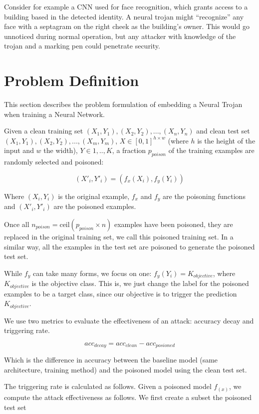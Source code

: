 \documentclass[letterpaper, 10 pt, conference]{ieeeconf}  %
\begin{document}
Consider for example a CNN used for face recognition, which grants access to a building based in the detected identity. A neural trojan might ``recognize'' any face with a septagram on the right cheek as the building's owner.  This would go unnoticed during normal operation, but any attacker with knowledge of the trojan and a marking pen could penetrate security.


\section{Problem Definition}

This section describes the problem formulation of embedding a Neural Trojan
when training a Neural Network.

Given a clean training set $(X_1, Y_1), (X_2, Y_2),..., (X_n, Y_n)$ and clean test set $(X_1, Y_1), (X_2, Y_2),..., (X_m, Y_m)$, $X \in [0, 1]^{h \times w}$ (where $h$ is the height of the input and $w$ the width), $Y \in 1,..,K$, a fraction $p_{poison}$ of the training examples are randomly selected and poisoned:

$$(X'_i, Y'_i) = (f_x(X_i), f_y(Y_i))$$

Where $(X_i, Y_i)$ is the original example, $f_x$ and $f_y$ are the poisoning functions and $(X'_i, Y'_i)$ are the poisoned examples.

Once all $n_{poison} = \text{ceil}(p_{poison} \times n)$ examples have been poisoned, they are replaced in the original training set, we call this poisoned training set. In a similar way, all the examples in the test set are poisoned to generate the poisoned test set.

While $f_y$ can take many forms, we focus on one: $f_y(Y_i) = K_{objective}$, where $K_{objective}$ is the objective class. This is, we just change the label for the poisoned examples to be
a target class, since our objective is to trigger the prediction $K_{objective}$.

We use two metrics to evaluate the effectiveness of an attack: accuracy decay
and triggering rate.

$$acc_{decay} = acc_{clean} - acc_{posioned}$$

Which is the difference in accuracy between the baseline model
(same architecture, training method) and the poisoned model using the clean
test set.

The triggering rate is calculated as follows. Given a poisoned model $f_(x)$,
we compute the attack effectiveness as follows. We first create a subset the
poisoned test set 
\end{document}
